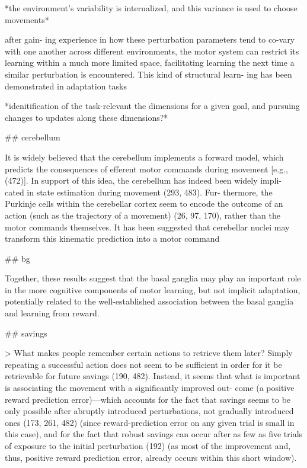 \documentclass[../main.tex]{subfiles}
\begin{document}
{{*the environment's variability is internalized, and this variance is used to choose movements*

after gain- ing experience in how these perturbation parameters tend to co-vary with one another across different environments, the motor system can restrict its learning within a much more limited space, facilitating learning the next time a similar perturbation is encountered. This kind of structural learn- ing has been demonstrated in adaptation tasks

*idenitification of the task-relevant the dimensions for a given goal, and pursuing changes to updates along these dimensions?*

## cerebellum

It is widely believed that the cerebellum implements a forward model, which predicts the consequences of efferent motor commands during movement [e.g., (472)]. In support of this idea, the cerebellum has indeed been widely impli- cated in state estimation during movement (293, 483). Fur- thermore, the Purkinje cells within the cerebellar cortex seem to encode the outcome of an action (such as the trajectory of a movement) (26, 97, 170), rather than the motor commands themselves. It has been suggested that cerebellar nuclei may transform this kinematic prediction into a motor command

## bg

Together, these results suggest that the basal ganglia may play an important role in the more cognitive components of motor learning, but not implicit adaptation, potentially related to the well-established association between the basal ganglia and learning from reward.

## savings

> What makes people remember certain actions to retrieve them later? Simply repeating a successful action does not seem to be sufficient in order for it be retrievable for future savings (190, 482). Instead, it seems that what is important is associating the movement with a significantly improved out- come (a positive reward prediction error)—which accounts for the fact that savings seems to be only possible after abruptly introduced perturbations, not gradually introduced ones (173, 261, 482) (since reward-prediction error on any given trial is small in this case), and for the fact that robust savings can occur after as few as five trials of exposure to the initial perturbation (192) (as most of the improvement and, thus, positive reward prediction error, already occurs within this short window).

}}
\end{document}
